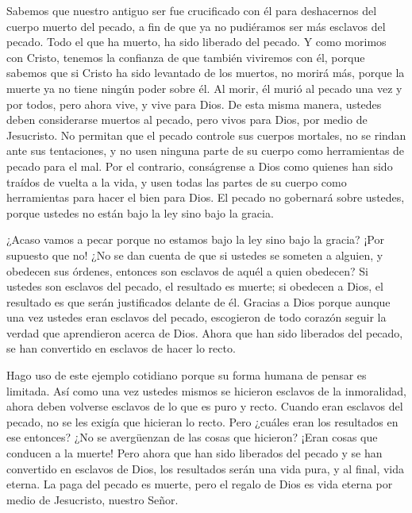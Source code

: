  Sabemos que nuestro antiguo ser fue crucificado con él para
deshacernos del cuerpo muerto del pecado, a fin de que ya no pudiéramos
ser más esclavos del pecado.  Todo el que ha muerto, ha sido
liberado del pecado.  Y como morimos con Cristo, tenemos la
confianza de que también viviremos con él,  porque sabemos
que si Cristo ha sido levantado de los muertos, no morirá más, porque la
muerte ya no tiene ningún poder sobre él.  Al morir, él
murió al pecado una vez y por todos, pero ahora vive, y vive para Dios.
 De esta misma manera, ustedes deben considerarse muertos
al pecado, pero vivos para Dios, por medio de Jesucristo. 
No permitan que el pecado controle sus cuerpos mortales, no se rindan
ante sus tentaciones,  y no usen ninguna parte de su cuerpo
como herramientas de pecado para el mal. Por el contrario, conságrense a
Dios como quienes han sido traídos de vuelta a la vida, y usen todas las
partes de su cuerpo como herramientas para hacer el bien para Dios.
 El pecado no gobernará sobre ustedes, porque ustedes no
están bajo la ley sino bajo la gracia.

 ¿Acaso vamos a pecar porque no estamos bajo la ley sino
bajo la gracia? ¡Por supuesto que no!  ¿No se dan cuenta de
que si ustedes se someten a alguien, y obedecen sus órdenes, entonces
son esclavos de aquél a quien obedecen? Si ustedes son esclavos del
pecado, el resultado es muerte; si obedecen a Dios, el resultado es que
serán justificados delante de él.  Gracias a Dios porque
aunque una vez ustedes eran esclavos del pecado, escogieron de todo
corazón seguir la verdad que aprendieron acerca de Dios. 
Ahora que han sido liberados del pecado, se han convertido en esclavos
de hacer lo recto.

 Hago uso de este ejemplo cotidiano porque su forma humana
de pensar es limitada. Así como una vez ustedes mismos se hicieron
esclavos de la inmoralidad, ahora deben volverse esclavos de lo que es
puro y recto.  Cuando eran esclavos del pecado, no se les
exigía que hicieran lo recto.  Pero ¿cuáles eran los
resultados en ese entonces? ¿No se avergüenzan de las cosas que
hicieron? ¡Eran cosas que conducen a la muerte!  Pero ahora
que han sido liberados del pecado y se han convertido en esclavos de
Dios, los resultados serán una vida pura, y al final, vida eterna.
 La paga del pecado es muerte, pero el regalo de Dios es
vida eterna por medio de Jesucristo, nuestro Señor.

